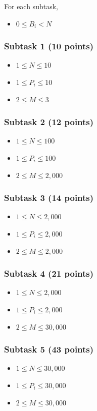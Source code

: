 \documentclass[a4paper]{article}
\begin{document}
For each subtask,
\begin{itemize}
\item $0 \le B_i < N$
\end{itemize}

\subsubsection*{Subtask 1 (10 points)}
\begin{itemize} \itemsep1pt \parskip0pt
\item $1 \le N \le 10$
\item $1 \le P_i \le 10$
\item $2 \le M \le 3$
\end{itemize}

\subsubsection*{Subtask 2 (12 points)}
\begin{itemize} \itemsep1pt \parskip0pt
\item $1 \le N \le 100$
\item $1 \le P_i \le 100$
\item $2 \le M \le 2,000$
\end{itemize}

\subsubsection*{Subtask 3 (14 points)}
\begin{itemize} \itemsep1pt \parskip0pt
\item $1 \le N \le 2,000$
\item $1 \le P_i \le 2,000$
\item $2 \le M \le 2,000$
\end{itemize}

\subsubsection*{Subtask 4 (21 points)}
\begin{itemize} \itemsep1pt \parskip0pt
\item $1 \le N \le 2,000$
\item $1 \le P_i \le 2,000$
\item $2 \le M \le 30,000$
\end{itemize}

\subsubsection*{Subtask 5 (43 points)}
\begin{itemize} \itemsep1pt \parskip0pt
\item $1 \le N \le 30,000$
\item $1 \le P_i \le 30,000$
\item $2 \le M \le 30,000$
\end{itemize}
\end{document}

